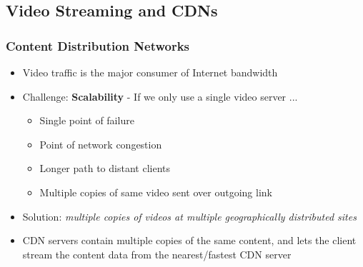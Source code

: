\subsection{Video Streaming and CDNs}
\subsubsection{Content Distribution Networks}
\begin{itemize}
	\item Video traffic is the major consumer of Internet bandwidth
	\item Challenge: \textbf{Scalability} - If we only use a single video server ...
	\begin{itemize}
		\item Single point of failure
		\item Point of network congestion
		\item Longer path to distant clients
		\item Multiple copies of same video sent over outgoing link
	\end{itemize}
	\item Solution: \textit{multiple copies of videos at multiple geographically distributed sites}
	\item CDN servers contain multiple copies of the same content, and lets the client stream the content data from the nearest/fastest CDN server
\end{itemize}

\pagebreak
